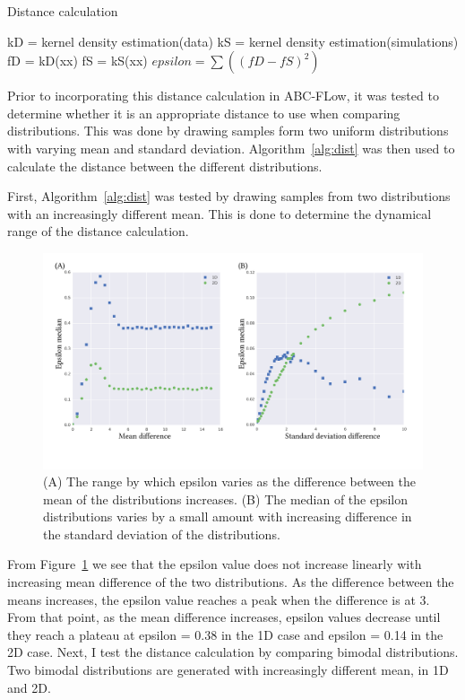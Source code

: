 \begin{algorithm}[htbp]
\caption{Distance calculation}
\label{alg:dist}
 \begin{algorithmic}[1]
    \Statex
	\State kD = kernel density estimation(data)
	\State kS = kernel density estimation(simulations)
	\State fD = kD(xx)
	\State fS = kS(xx)    
	\State $epsilon = \sum((fD-fS)^2)$
  \end{algorithmic}
\end{algorithm}

Prior to incorporating this distance calculation in ABC-FLow, it was tested to determine whether it is an appropriate distance to use when comparing distributions. This was done by drawing samples form two uniform distributions with varying mean and standard deviation. Algorithm~\ref{alg:dist} was then used to calculate the distance between the different distributions.

First, Algorithm~\ref{alg:dist} was tested by drawing samples from two distributions with an increasingly different mean. This is done to determine the dynamical range of the distance calculation.

\begin{figure}[tb]
\centering
\includegraphics[scale=0.7]{../../chapters/chapterABCFlow/images/mus_sigmas-01.png}
\caption[LoF caption]{\label{fig:epsilon_mu_s_diff}(A) The range by which epsilon varies as the difference between the mean of the distributions increases. (B) The median of the epsilon distributions varies by a small amount with increasing difference in the standard deviation of the distributions.}
\end{figure}

From Figure~\ref{fig:epsilon_mu_s_diff} we see that the epsilon value does not increase linearly with increasing mean difference of the two distributions. As the difference between the means increases, the epsilon value reaches a peak when the difference is at 3. From that point, as the mean difference increases, epsilon values decrease until they reach a plateau at epsilon = 0.38 in the 1D case and epsilon = 0.14 in the 2D case. Next, I test the distance calculation by comparing bimodal distributions. Two bimodal distributions are generated with increasingly different mean, in 1D and 2D. 



